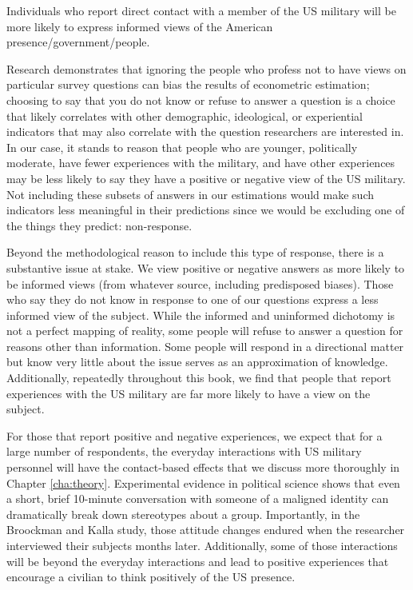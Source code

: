 \begin{subhyp}
	
	\begin{hyp}
		Individuals who report direct contact with a member of the US military will be more likely to express informed views of the American presence/government/people. 
	\end{hyp}
	
	Research demonstrates that ignoring the people who profess not to have views on particular survey questions can bias the results of econometric estimation;\cite{Kleinberg2018} choosing to say that you do not know or refuse to answer a question is a choice that likely correlates with other demographic, ideological, or experiential indicators that may also correlate with the question researchers are interested in. In our case, it stands to reason that people who are younger, politically moderate, have fewer experiences with the military, and have other experiences may be less likely to say they have a positive or negative view of the US military. Not including these subsets of answers in our estimations would make such indicators less meaningful in their predictions since we would be excluding one of the things they predict: non-response.
	
	Beyond the methodological reason to include this type of response, there is a substantive issue at stake. We view positive or negative answers as more likely to be informed views (from whatever source, including predisposed biases). Those who say they do not know in response to one of our questions express a less informed view of the subject. While the informed and uninformed dichotomy is not a perfect mapping of reality, some people will refuse to answer a question for reasons other than information. Some people will respond in a directional matter but know very little about the issue serves as an approximation of knowledge. Additionally, repeatedly throughout this book, we find that people that report experiences with the US military are far more likely to have a view on the subject.
	
	For those that report positive and negative experiences, we expect that for a large number of respondents, the everyday interactions with US military personnel will have the contact-based effects that we discuss more thoroughly in Chapter \ref{cha:theory}. Experimental evidence in political science shows that even a short, brief 10-minute conversation with someone of a maligned identity can dramatically break down stereotypes about a group.\cite{Broockman2016} Importantly, in the Broockman and Kalla study, those attitude changes endured when the researcher interviewed their subjects months later.\cite{Broockman2016} Additionally, some of those interactions will be beyond the everyday interactions and lead to positive experiences that encourage a civilian to think positively of the US presence.
	

\end{subhyp}
